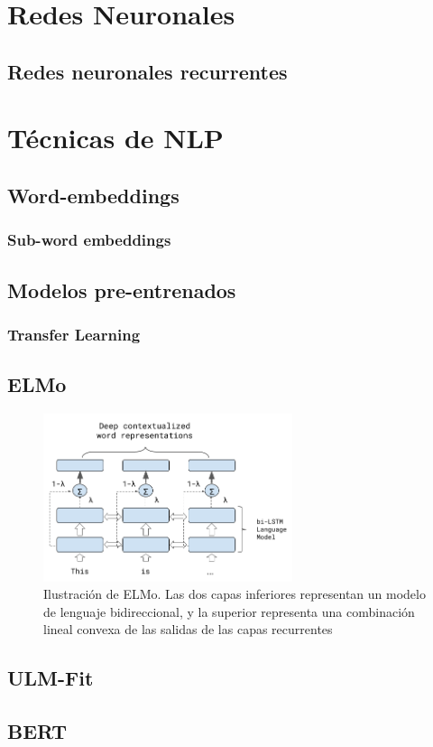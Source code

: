 
\section{Redes Neuronales}

\subsection{Redes neuronales recurrentes}

\section{Técnicas de NLP}



\subsection{Word-embeddings}

\subsubsection{Sub-word embeddings}

\subsection{Modelos pre-entrenados}

\subsubsection{Transfer Learning}

\subsection{ELMo}
\begin{figure}
    \centering
    \includegraphics[width=0.65\textwidth]{img/ELMo.png}
    \caption{Ilustración de ELMo. Las dos capas inferiores representan un modelo de lenguaje bidireccional, y la superior representa una combinación lineal convexa de las salidas de las capas recurrentes}
    \label{fig:modelos_offenseval_hateval}
\end{figure}
\subsection{ULM-Fit}
\subsection{BERT}